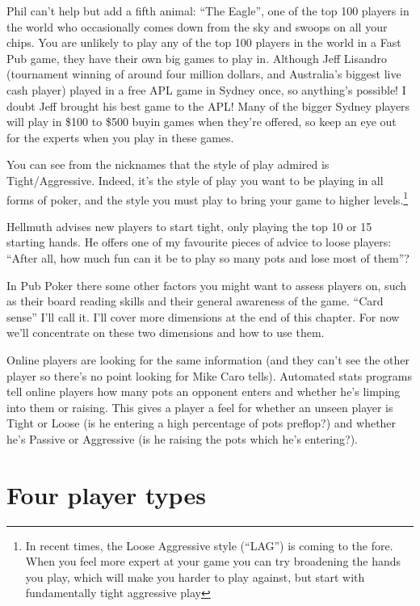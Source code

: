 Phil can't help but add a fifth animal: ``The Eagle'', one of the
top 100 players in the world who occasionally comes down from
the sky and swoops on all your chips. You are unlikely to play
any of the top 100 players in the world in a Fast Pub game, they
have their own big games to play in. Although Jeff Lisandro
(tournament winning of around four million dollars, and
Australia's biggest live cash player) played in
a free APL game in Sydney once, so anything's possible! I doubt
Jeff brought his best game to the APL! Many
of the bigger Sydney players will play in \$100 to \$500 buyin
games when they're offered, so keep an eye out for the experts
when you play in these games.

You can see from the nicknames that the style
of play admired is Tight/Aggressive. Indeed,
it's the style of play you want to be playing in all forms of
poker, and the style you must play to bring your game to higher
levels.\footnote{In recent times, the Loose Aggressive style
(``LAG'') is coming to the fore. When you feel more expert
at your game you can try broadening the hands you play, which
will make you harder to play against, but start with fundamentally
tight aggressive play}

Hellmuth advises new players to start tight, only playing the
top 10 or 15 starting hands. He offers one of my favourite pieces
of advice to loose players: ``After all, how much fun can it be to
play so many pots and lose most of them''?

In Pub Poker there some other factors you might want to assess
players on, such as their board reading skills and their general
awareness of the game. ``Card sense'' I'll call it.  I'll cover more
dimensions at the end of this chapter. For now we'll concentrate on these
two dimensions and how to use them.

Online players are looking for the same information (and they
can't see the other player so there's no point looking for Mike Caro
tells). Automated stats programs tell online players how many pots an
opponent enters and whether he's limping into them or raising. This
gives a player a feel for whether an unseen player is Tight or Loose
(is he entering a high percentage of pots preflop?) and whether he's
Passive or Aggressive (is he raising the pots which he's entering?).


\section{Four player types}

